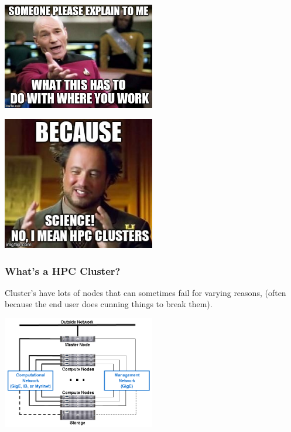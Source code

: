 \documentclass{beamer}
\begin{document}
\begin{frame}
\begin{center}
	\includegraphics[width=0.5\textwidth]{imgs/picard.jpg}
\end{center}
\end{frame}

\begin{frame}
\begin{center}
	\includegraphics[width=0.5\textwidth]{imgs/scienceguy.jpg}
\end{center}
\end{frame}

\begin{frame}
\frametitle{What's a HPC Cluster?}
Cluster's have lots of nodes that can sometimes fail for varying reasons, (often because the end user does cunning things to break them).
    \begin{center}
     \includegraphics[width=0.5\textwidth]{imgs/cluster_anatomy.png}
     \end{center}
\end{frame}
\end{document}
